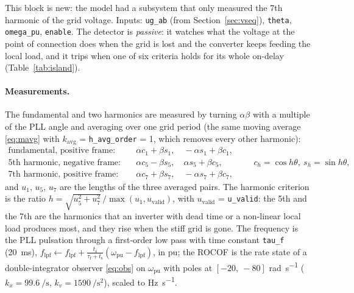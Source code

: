\documentclass[11pt,a4paper]{scrartcl}
\newcommand{\ped}[1]{_{\mathrm{#1}}}
\newcommand{\code}[1]{\texttt{#1}}
\begin{document}
\begin{onehalfspace}
This block is new: the model had a subsystem that only measured the 7th harmonic of the grid voltage. Inputs: \code{ug\_ab} (from Section~\ref{sec:vseq}), \code{theta}, \code{omega\_pu}, \code{enable}. The detector is \emph{passive}: it watches what the voltage at the point of connection does when the grid is lost and the converter keeps feeding the local load, and it trips when one of six criteria holds for its whole on-delay (Table~\ref{tab:island}).

\paragraph{Measurements.} The fundamental and two harmonics are measured by turning $\alpha\beta$ with a multiple of the PLL angle and averaging over one grid period (the same moving average \eqref{eq:mavg} with $k\ped{avg}$ = \code{h\_avg\_order} = 1, which removes every other harmonic):
\begin{equation}
	\begin{aligned}
		\text{fundamental, positive frame:}\quad & \alpha c_1 + \beta s_1, \quad -\alpha s_1 + \beta c_1, \\
		\text{5th harmonic, negative frame:}\quad & \alpha c_5 - \beta s_5, \quad \alpha s_5 + \beta c_5, \\
		\text{7th harmonic, positive frame:}\quad & \alpha c_7 + \beta s_7, \quad -\alpha s_7 + \beta c_7,
	\end{aligned}
	\qquad c_h = \cos h\theta,\ s_h = \sin h\theta,
	\label{eq:harm}
\end{equation}
and $u_1$, $u_5$, $u_7$ are the lengths of the three averaged pairs. The harmonic criterion is the ratio $h = \sqrt{u_5^2 + u_7^2}\,/\max(u_1, u\ped{valid})$, with $u\ped{valid}$ = \code{u\_valid}: the 5th and the 7th are the harmonics that an inverter with dead time or a non-linear local load produces most, and they rise when the stiff grid is gone. The frequency is the PLL pulsation through a first-order low pass with time constant \code{tau\_f} (\SI{20}{\milli\second}), $f\ped{lpf} \leftarrow f\ped{lpf} + \frac{t\ped{s}}{\tau\ped{f} + t\ped{s}}(\omega\ped{pu} - f\ped{lpf})$, in pu; the ROCOF is the rate state of a double-integrator observer \eqref{eq:obs} on $\omega\ped{pu}$ with poles at $[-20,\ -80]$ \si{\radian\per\second} ($k_x = \SI{99.6}{\per\second}$, $k_v = \SI{1590}{\per\second\squared}$), scaled to \si{\hertz\per\second}.


\end{onehalfspace}
\end{document}
